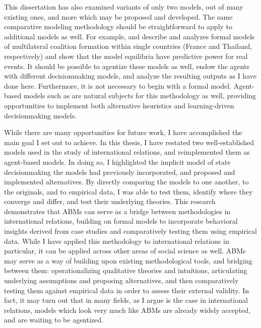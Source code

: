 This dissertation has also examined variants of only two models, out of many existing ones, and more which may be proposed and developed. The same comparative modeling methodology should be straightforward to apply to additional models as well. For example, \citet{tsebelis_1988} and \citet{metternich_2013} describe and analyzes formal models of multilateral coalition formation within single countries (France and Thailand, respectively) and show that the model equilibria have predictive power for real events. It should be possible to agentize these models as well, endow the agents with different decisionmaking models, and analyze the resulting outputs as I have done here. Furthermore, it is not necessary to begin with a formal model. Agent-based models such as \citet{cederman_1997} are natural subjects for this methodology as well, providing opportunities to implement both alternative heuristics and learning-driven decisionmaking models. 

While there are many opportunities for future work, I have accomplished the main goal I set out to achieve. In this thesis, I have restated two well-established models used in the study of international relations, and reimplemented them as agent-based models. In doing so, I highlighted the implicit model of state decisionmaking the models had previously incorporated, and proposed and implemented alternatives. By directly comparing the models to one another, to the originals, and to empirical data, I was able to test them, identify where they converge and differ, and test their underlying theories. This research demonstrates that ABMs can serve as a bridge between methodologies in international relations, building on formal models to incorporate behavioral insights derived from case studies and comparatively testing them using empirical data. While I have applied this methodology to international relations in particular, it can be applied across other areas of social science as well. ABMs may serve as a way of building upon existing methodological tools, and bridging between them: operationalizing qualitative theories and intuitions, articulating underlying assumptions and proposing alternatives, and then comparatively testing them against empirical data in order to assess their external validity. In fact, it may turn out that in many fields, as I argue is the case in international relations, models which look very much like ABMs are already widely accepted, and are waiting to be agentized.
